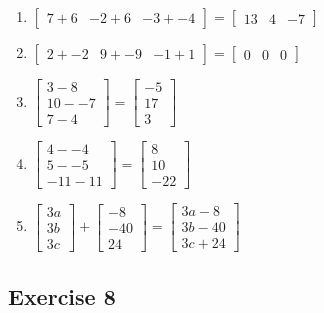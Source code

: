 \documentclass[11pt]{article}
\begin{document}
\begin{enumerate}
	\item %
$
\begin{bmatrix}
7+6 & -2+6 & -3+-4
\end{bmatrix}=
\begin{bmatrix}
13 & 4 & -7
\end{bmatrix}
$
	\item %
$
\begin{bmatrix}
2+-2 & 9+-9 & -1+1
\end{bmatrix}=
\begin{bmatrix}
0 & 0 & 0
\end{bmatrix}
$
	\item %
$
\begin{bmatrix}
3-8 \\
10--7 \\
7-4
\end{bmatrix}=
\begin{bmatrix}
-5 \\
17 \\
3
\end{bmatrix}
$
	\item %
$
\begin{bmatrix}
4--4 \\
5--5 \\
-11-11
\end{bmatrix}=
\begin{bmatrix}
8 \\
10 \\
-22
\end{bmatrix}
$
	\item %
$
\begin{bmatrix}
3a \\
3b \\
3c
\end{bmatrix}+
\begin{bmatrix}
-8 \\
-40 \\
24
\end{bmatrix}=
\begin{bmatrix}
3a-8 \\
3b-40 \\
3c+24
\end{bmatrix}
$
\end{enumerate}

\subsection{Exercise 8}
\end{document}
